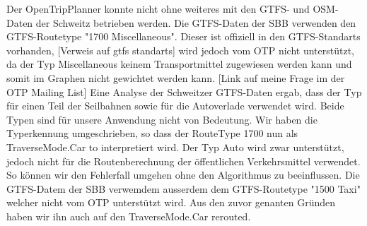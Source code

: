 Der OpenTripPlanner konnte nicht ohne weiteres mit den GTFS- und OSM-Daten der Schweitz betrieben werden. 
Die GTFS-Daten der SBB verwenden den GTFS-Routetype "1700 Miscellaneous". Dieser ist offiziell in den GTFS-Standarts vorhanden,  [Verweis auf gtfs standarts] wird jedoch vom OTP nicht unterstützt, da der Typ Miscellaneous keinem Transportmittel zugewiesen werden kann und somit im Graphen nicht gewichtet werden kann. [Link auf meine Frage im der OTP Mailing List] Eine Analyse der Schweitzer GTFS-Daten ergab, dass der Typ für einen Teil der Seilbahnen sowie für die Autoverlade verwendet wird. Beide Typen sind für unsere Anwendung nicht von Bedeutung. Wir haben die Typerkennung umgeschrieben, so dass der RouteType 1700 nun als TraverseMode.Car to interpretiert wird. Der Typ Auto wird zwar unterstützt, jedoch nicht für die Routenberechnung der öffentlichen Verkehrsmittel verwendet. So können wir den Fehlerfall umgehen ohne den Algorithmus zu beeinflussen.
Die GTFS-Datem der SBB verwemdem ausserdem dem GTFS-Routetype "1500 Taxi" welcher nicht vom OTP unterstützt wird. Aus den zuvor genanten Gründen haben wir ihn auch auf den TraverseMode.Car rerouted.